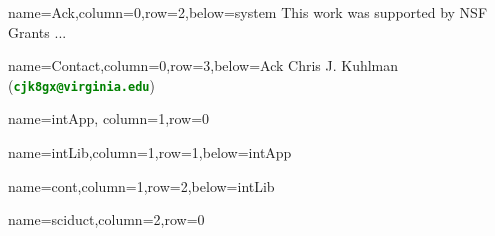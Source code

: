 \documentclass[landscape,a0paper,fontscale=0.285]{baposter} %
\begin{document}
\begin{poster}
{}


          {name=Ack,column=0,row=2,below=system}{
{\footnotesize
This work was supported by NSF
Grants ...
}
}


          {name=Contact,column=0,row=3,below=Ack}{
{\footnotesize
{Chris J. Kuhlman~ (\textcolor{green}{\textbf{\texttt{cjk8gx@virginia.edu}}})}
}}





          {name=intApp, column=1,row=0}{

}


          {name=intLib,column=1,row=1,below=intApp}{
          

} 



          {name=cont,column=1,row=2,below=intLib}{

}




          {name=sciduct,column=2,row=0}{

}
\end{poster}
\end{document}
